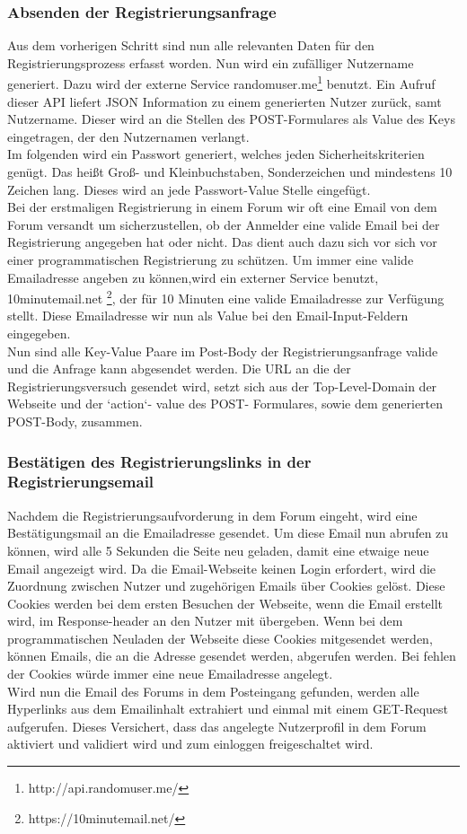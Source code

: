 \subsubsection{Absenden der Registrierungsanfrage}
Aus dem vorherigen Schritt sind nun alle relevanten Daten für den Registrierungsprozess erfasst worden. Nun wird ein zufälliger Nutzername generiert. Dazu wird der externe Service randomuser.me\footnote{http://api.randomuser.me/} benutzt. Ein Aufruf dieser API liefert JSON Information zu einem generierten Nutzer zurück, samt Nutzername. Dieser wird an die Stellen des POST-Formulares als Value des Keys eingetragen, der den Nutzernamen verlangt.\\
Im folgenden wird ein Passwort generiert, welches jeden Sicherheitskriterien genügt. Das heißt Groß- und Kleinbuchstaben, Sonderzeichen und mindestens 10 Zeichen lang. Dieses wird an jede Passwort-Value Stelle eingefügt.\\
Bei der erstmaligen Registrierung in einem Forum wir oft eine Email von dem Forum versandt um sicherzustellen, ob der Anmelder eine valide Email bei der Registrierung angegeben hat oder nicht. Das dient auch dazu sich vor sich vor einer programmatischen Registrierung zu schützen. Um immer eine valide Emailadresse angeben zu können,wird ein externer Service benutzt, 10minutemail.net \footnote{https://10minutemail.net/}, der für 10 Minuten eine valide Emailadresse zur Verfügung stellt. Diese Emailadresse wir nun als Value bei den Email-Input-Feldern eingegeben.\\
Nun sind alle Key-Value Paare im Post-Body der Registrierungsanfrage valide und die Anfrage kann abgesendet werden.
Die URL an die der Registrierungsversuch gesendet wird, setzt sich aus der Top-Level-Domain der Webseite und der `action`- value des POST- Formulares, sowie dem generierten POST-Body, zusammen.
\subsubsection{Bestätigen des Registrierungslinks in der Registrierungsemail}
Nachdem die Registrierungsaufvorderung in dem Forum eingeht, wird eine Bestätigungsmail an die Emailadresse gesendet.
Um diese Email nun abrufen zu können, wird alle 5 Sekunden die Seite neu geladen, damit eine etwaige neue Email angezeigt wird. Da die Email-Webseite keinen Login erfordert, wird die Zuordnung zwischen Nutzer und zugehörigen Emails über Cookies gelöst. Diese Cookies werden bei dem ersten Besuchen der Webseite, wenn die Email erstellt wird, im Response-header an den Nutzer mit übergeben. Wenn bei dem programmatischen Neuladen der Webseite diese Cookies mitgesendet werden, können Emails, die an die Adresse gesendet werden, abgerufen werden. Bei fehlen der Cookies würde immer eine neue Emailadresse angelegt.\\
Wird nun die Email des Forums in dem Posteingang gefunden, werden alle Hyperlinks aus dem Emailinhalt extrahiert und einmal mit einem GET-Request aufgerufen. Dieses Versichert, dass das angelegte Nutzerprofil in dem Forum aktiviert und validiert wird und zum einloggen freigeschaltet wird.

